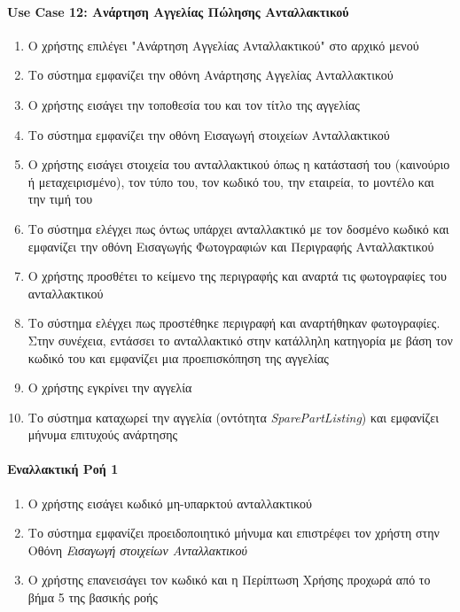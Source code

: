 \documentclass{../ol-softwaremanual}
\begin{document}
	\paragraph{\en Use Case 12: \gr Ανάρτηση Αγγελίας Πώλησης Ανταλλακτικού \gr}
	
	\begin{enumerate}
		\item Ο χρήστης επιλέγει \en"\gr Ανάρτηση Αγγελίας Ανταλλακτικού\en" \gr στο αρχικό μενού
		\item Το σύστημα εμφανίζει την οθόνη Ανάρτησης Αγγελίας Ανταλλακτικού
		\item Ο χρήστης εισάγει την τοποθεσία του και τον τίτλο της αγγελίας
		\item Το σύστημα εμφανίζει την οθόνη Εισαγωγή στοιχείων Ανταλλακτικού
		\item Ο χρήστης εισάγει στοιχεία του ανταλλακτικού όπως η κατάστασή του (καινούριο ή μεταχειρισμένο), τον τύπο του, τον κωδικό του, την εταιρεία, το μοντέλο και την τιμή του
		\item Το σύστημα ελέγχει πως όντως υπάρχει ανταλλακτικό με τον δοσμένο κωδικό και εμφανίζει την οθόνη Εισαγωγής Φωτογραφιών και Περιγραφής Ανταλλακτικού
		\item Ο χρήστης προσθέτει το κείμενο της περιγραφής και αναρτά τις φωτογραφίες του ανταλλακτικού
		\item Το σύστημα ελέγχει πως προστέθηκε περιγραφή και αναρτήθηκαν φωτογραφίες. Στην συνέχεια, εντάσσει το ανταλλακτικό στην κατάλληλη κατηγορία με βάση τον κωδικό του και εμφανίζει μια προεπισκόπηση της αγγελίας
		\item Ο χρήστης εγκρίνει την αγγελία
		\item Το σύστημα καταχωρεί την αγγελία (οντότητα \en\textit{SparePartListing}\gr) και εμφανίζει μήνυμα επιτυχούς ανάρτησης
	\end{enumerate}
	
	
	\paragraph{Εναλλακτική Ροή 1}
	
	\begin{enumerate}
		\item Ο χρήστης εισάγει κωδικό μη-υπαρκτού ανταλλακτικού
		\item Το σύστημα εμφανίζει προειδοποιητικό μήνυμα και επιστρέφει τον χρήστη στην Οθόνη \textit{Εισαγωγή στοιχείων Ανταλλακτικού}
		\item Ο χρήστης επανεισάγει τον κωδικό και η Περίπτωση Χρήσης προχωρά από το βήμα 5 της βασικής ροής
	\end{enumerate}
	
\end{document}
